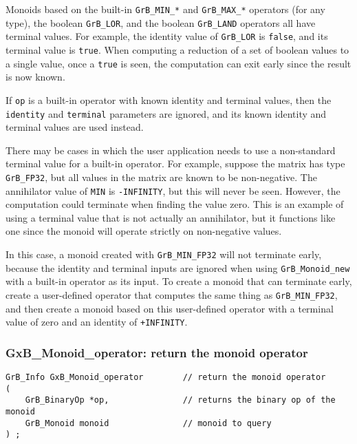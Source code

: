 \documentclass[12pt]{article}
\begin{document}
{Monoids based on the built-in \verb'GrB_MIN_*' and \verb'GrB_MAX_*' operators
(for any type), the boolean \verb'GrB_LOR', and the boolean \verb'GrB_LAND'
operators all have terminal values.  For example, the identity value of
\verb'GrB_LOR' is \verb'false', and its terminal value is \verb'true'.  When
computing a reduction of a set of boolean values to a single value, once a
\verb'true' is seen, the computation can exit early since the result is now
known.

If \verb'op' is a built-in operator with known identity and terminal values,
then the \verb'identity' and \verb'terminal' parameters are ignored, and its
known identity and terminal values are used instead.

There may be cases in which the user application needs to use a non-standard
terminal value for a built-in operator.  For example, suppose the matrix has
type \verb'GrB_FP32', but all values in the matrix are known to be
non-negative.  The annihilator value of \verb'MIN' is \verb'-INFINITY', but
this will never be seen.  However, the computation could terminate when
finding the value zero.  This is an example of using a terminal value that is
not actually an annihilator, but it functions like one since the monoid will
operate strictly on non-negative values.

In this case, a monoid created with \verb'GrB_MIN_FP32' will not terminate
early, because the identity and terminal inputs are ignored when using
\verb'GrB_Monoid_new' with a built-in operator as its input.
To create a monoid that can terminate early, create a user-defined operator
that computes the same thing as \verb'GrB_MIN_FP32', and then create a monoid
based on this user-defined operator with a terminal value of zero and an
identity of \verb'+INFINITY'.

\subsubsection{{\sf GxB\_Monoid\_operator:} return the monoid operator}
\label{monoid_operator}

\begin{mdframed}[userdefinedwidth=6in]
{\footnotesize
\begin{verbatim}
GrB_Info GxB_Monoid_operator        // return the monoid operator
(
    GrB_BinaryOp *op,               // returns the binary op of the monoid
    GrB_Monoid monoid               // monoid to query
) ;
\end{verbatim}
} \end{mdframed}

}
\end{document}
